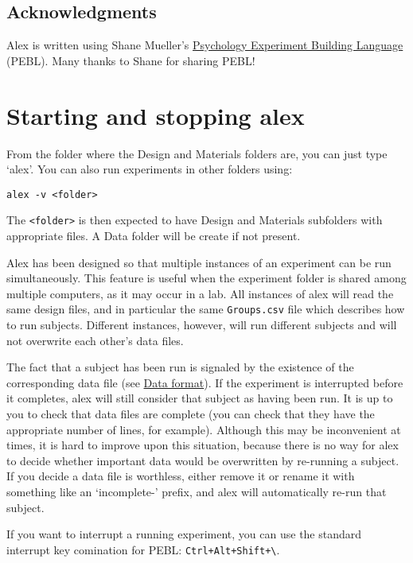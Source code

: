 \documentclass[11pt,]{article}
\begin{document}
\subsection{Acknowledgments}

Alex is written using Shane Mueller's
\href{http://pebl.sourceforge.net}{Psychology Experiment Building
Language} (PEBL). Many thanks to Shane for sharing PEBL!

\section{Starting and stopping alex}

From the folder where the Design and Materials folders are, you can just
type `alex'. You can also run experiments in other folders using:

\begin{verbatim}
alex -v <folder>
\end{verbatim}

The \texttt{\textless{}folder\textgreater{}} is then expected to have
Design and Materials subfolders with appropriate files. A Data folder
will be create if not present.

Alex has been designed so that multiple instances of an experiment can
be run simultaneously. This feature is useful when the experiment folder
is shared among multiple computers, as it may occur in a lab. All
instances of alex will read the same design files, and in particular the
same \texttt{Groups.csv} file which describes how to run subjects.
Different instances, however, will run different subjects and will not
overwrite each other's data files.

The fact that a subject has been run is signaled by the existence of the
corresponding data file (see \hyperref[data-format]{Data format}). If
the experiment is interrupted before it completes, alex will still
consider that subject as having been run. It is up to you to check that
data files are complete (you can check that they have the appropriate
number of lines, for example). Although this may be inconvenient at
times, it is hard to improve upon this situation, because there is no
way for alex to decide whether important data would be overwritten by
re-running a subject. If you decide a data file is worthless, either
remove it or rename it with something like an `incomplete-' prefix, and
alex will automatically re-run that subject.

If you want to interrupt a running experiment, you can use the standard
interrupt key comination for PEBL:
\texttt{Ctrl+Alt+Shift+\textbackslash{}}.
\end{document}
